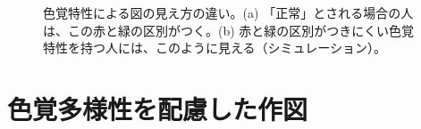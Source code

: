 \begin{figure}
  \centering
  \caption[色覚特性による図の見え方の違い]{色覚特性による図の見え方の違い。(a) 「正常」とされる場合の人は、この赤と緑の区別がつく。(b) 赤と緑の区別がつきにくい色覚特性を持つ人には、このように見える（シミュレーション）。}
\end{figure}

\section{色覚多様性を配慮した作図}

